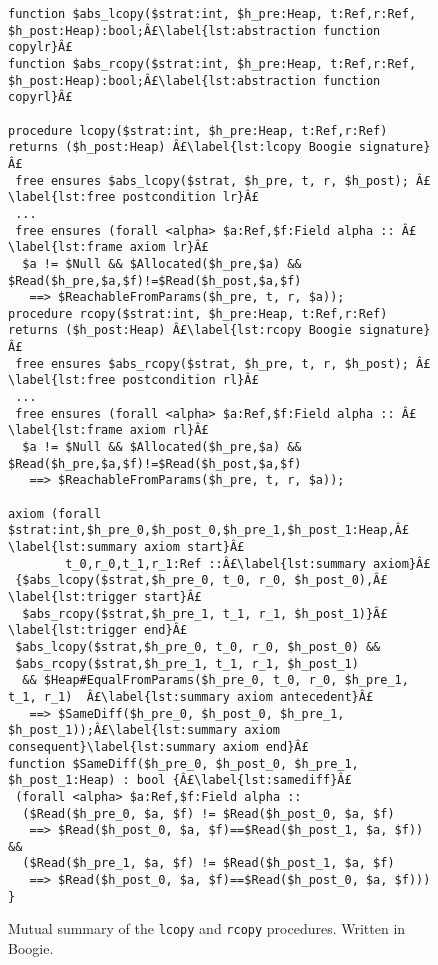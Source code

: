 \documentclass[runningheads,a4paper]{llncs}
\begin{document}
\sloppy

\begin{figure}[h!tbp]
\begin{lstlisting}[style=Boogie,firstnumber=auto,name=copyex]
function $abs_lcopy($strat:int, $h_pre:Heap, t:Ref,r:Ref, $h_post:Heap):bool;Â£\label{lst:abstraction function copylr}Â£
function $abs_rcopy($strat:int, $h_pre:Heap, t:Ref,r:Ref, $h_post:Heap):bool;Â£\label{lst:abstraction function copyrl}Â£

procedure lcopy($strat:int, $h_pre:Heap, t:Ref,r:Ref) returns ($h_post:Heap) Â£\label{lst:lcopy Boogie signature}Â£
 free ensures $abs_lcopy($strat, $h_pre, t, r, $h_post); Â£\label{lst:free postcondition lr}Â£
 ...
 free ensures (forall <alpha> $a:Ref,$f:Field alpha :: Â£\label{lst:frame axiom lr}Â£
  $a != $Null && $Allocated($h_pre,$a) && $Read($h_pre,$a,$f)!=$Read($h_post,$a,$f)
   ==> $ReachableFromParams($h_pre, t, r, $a));
procedure rcopy($strat:int, $h_pre:Heap, t:Ref,r:Ref) returns ($h_post:Heap) Â£\label{lst:rcopy Boogie signature}Â£
 free ensures $abs_rcopy($strat, $h_pre, t, r, $h_post); Â£\label{lst:free postcondition rl}Â£
 ...
 free ensures (forall <alpha> $a:Ref,$f:Field alpha :: Â£\label{lst:frame axiom rl}Â£
  $a != $Null && $Allocated($h_pre,$a) && $Read($h_pre,$a,$f)!=$Read($h_post,$a,$f)
   ==> $ReachableFromParams($h_pre, t, r, $a));

axiom (forall $strat:int,$h_pre_0,$h_post_0,$h_pre_1,$h_post_1:Heap,Â£\label{lst:summary axiom start}Â£
        t_0,r_0,t_1,r_1:Ref ::Â£\label{lst:summary axiom}Â£
 {$abs_lcopy($strat,$h_pre_0, t_0, r_0, $h_post_0),Â£\label{lst:trigger start}Â£
  $abs_rcopy($strat,$h_pre_1, t_1, r_1, $h_post_1)}Â£\label{lst:trigger end}Â£
 $abs_lcopy($strat,$h_pre_0, t_0, r_0, $h_post_0) &&
 $abs_rcopy($strat,$h_pre_1, t_1, r_1, $h_post_1)
  && $Heap#EqualFromParams($h_pre_0, t_0, r_0, $h_pre_1, t_1, r_1)  Â£\label{lst:summary axiom antecedent}Â£
   ==> $SameDiff($h_pre_0, $h_post_0, $h_pre_1, $h_post_1));Â£\label{lst:summary axiom consequent}\label{lst:summary axiom end}Â£
function $SameDiff($h_pre_0, $h_post_0, $h_pre_1, $h_post_1:Heap) : bool {Â£\label{lst:samediff}Â£
 (forall <alpha> $a:Ref,$f:Field alpha ::
  ($Read($h_pre_0, $a, $f) != $Read($h_post_0, $a, $f)
   ==> $Read($h_post_0, $a, $f)==$Read($h_post_1, $a, $f)) &&
  ($Read($h_pre_1, $a, $f) != $Read($h_post_1, $a, $f)
   ==> $Read($h_post_0, $a, $f)==$Read($h_post_0, $a, $f))) }
\end{lstlisting}
\caption{Mutual summary of the \texttt{lcopy} and \texttt{rcopy} procedures. Written in Boogie.}\label{fig:mutual summary}
\end{figure}
\end{document}
